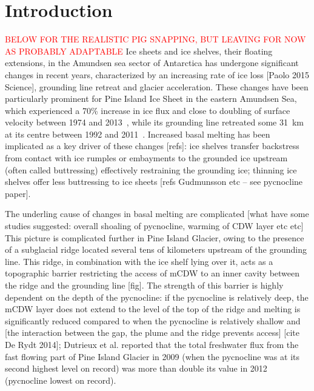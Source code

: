 \documentclass[draft]{agujournal2019}
\newcommand{\red}[1]{\textcolor{red}{#1}}
\begin{document}
%
%

\section{Introduction}
\red{BELOW FOR THE REALISTIC PIG SNAPPING, BUT LEAVING FOR NOW AS PROBABLY ADAPTABLE}
Ice sheets and ice shelves, their floating extensions, in the Amundsen sea sector of Antarctica has undergone significant changes in recent years, characterized by an increasing rate of ice loss [Paolo 2015 Science], grounding line retreat and glacier acceleration. These changes have been particularly prominent for Pine Island Ice Sheet in the eastern Amundsen Sea, which experienced a 70\% increase in ice flux and close to doubling of surface velocity between 1974 and 2013~\cite{Mouginot2014GRL}, while its grounding line retreated some 31~km at its centre between 1992 and 2011~\cite{Rignot2014GRL}. Increased basal melting has been implicated as a key driver of these changes [refs]: ice shelves transfer backstress from contact with ice rumples or embayments to the grounded ice upstream (often called buttressing) effectively restraining the grounding ice; thinning ice shelves offer less buttressing to ice sheets [refs Gudmunsson etc -- see pycnocline paper].

The underling cause of changes in basal melting are complicated [what have some studies suggested: overall shoaling of pycnocline, warming of CDW layer etc etc] This picture is complicated further in Pine Island Glacier, owing to the presence of a subglacial ridge located several tens of kilometers upstream of the grounding line. This ridge, in combination with the ice shelf lying over it, acts as a topographic barrier restricting the access of mCDW to an inner cavity between the ridge and the grounding line [fig]. The strength of this barrier is highly dependent on the depth of the pycnocline: if the pycnocline is relatively deep, the mCDW layer does not extend to the level of the top of the ridge and melting is significantly reduced compared to when the pycnocline is relatively shallow  and [the interaction between the gap, the plume and the ridge prevents access] [cite De Rydt 2014]; Dutrieux et al. reported that the total freshwater flux from the fast flowing part of Pine Island Glacier in 2009 (when the pycnocline was at its second highest level on record) was more than double its value in 2012 (pycnocline lowest on record).
\end{document}
